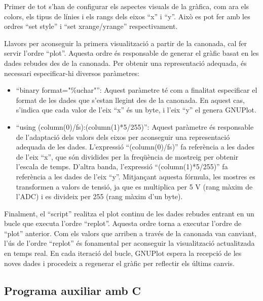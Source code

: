 \documentclass{tfgitic}[2023/06/30]
\begin{document}
Primer de tot s'han de configurar els aspectes visuals de la gràfica,
com ara els colors, els tipus de línies i els rangs dels eixos ``x'' i
``y''. Això es pot fer amb les ordres ``set style'' i ``set
xrange/yrange'' respectivament.

Llavors per aconseguir la primera visualització a partir de la
canonada, cal fer servir l'ordre ``plot''. Aquesta ordre és
responsable de generar el gràfic basat en les dades rebudes des de la
canonada. Per obtenir una representació adequada, és necessari
especificar-hi diversos paràmetres:

\begin{itemize}
	\item ``binary format="\%uchar"'': Aquest paràmetre té com a
          finalitat especificar el format de les dades que s'estan
          llegint des de la canonada. En aquest cas, s'indica que cada
          valor de l'eix ``x'' és un byte, i l'eix ``y'' el genera
          GNUPlot.
	\item ``using (column(0)/fs):(column(1)*5/255)'': Aquest
          paràmetre és responsable de l'adaptació dels valors dels
          eixos per aconseguir una representació adequada de les
          dades. L'expressió ``(column(0)/fs)'' fa referència a les
          dades de l'eix ``x'', que són dividides per la freqüència de
          mostreig per obtenir l'escala de temps. D'altra banda,
          l'expressió ``(column(1)*5/255)'' fa referència a les dades
          de l'eix ``y''. Mitjançant aquesta fórmula, les mostres es
          transformen a valors de tensió, ja que es multiplica per 5 V
          (rang màxim de l'ADC) i es divideix per 255 (rang màxim d'un
          byte).
\end{itemize}

Finalment, el ``script'' realitza el plot continu de les dades rebudes
entrant en un bucle que executa l'ordre ``replot''. Aquesta ordre
torna a executar l'ordre de ``plot'' anterior. Com els valors que
arriben a través de la canonada van canviant, l'ús de l'ordre
``replot'' és fonamental per aconseguir la visualització actualitzada
en temps real. En cada iteració del bucle, GNUPlot espera la recepció
de les noves dades i procedeix a regenerar el gràfic per reflectir els
últims canvis.

\newpage

\subsection{Programa auxiliar amb C}
\end{document}
